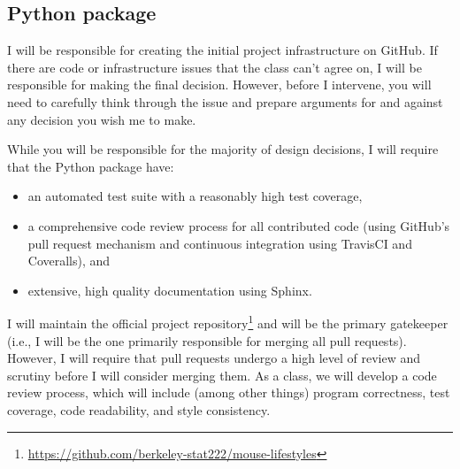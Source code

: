 \documentclass[11pt, oneside]{article}   	%
\begin{document}
\subsection{Python package}

I will be responsible for creating the initial project infrastructure on
GitHub.  If there are code or infrastructure issues that the class can't agree
on, I will be responsible for making the final decision.  However, before I
intervene, you will need to carefully think through the issue and prepare
arguments for and against any decision you wish me to make.

While you will be responsible for the majority of design decisions, I will
require that the Python package have:

\begin{itemize}
\item an automated test suite with a reasonably high test coverage,
\item a comprehensive code review process for all contributed code (using
   GitHub's pull request mechanism and continuous integration using
   TravisCI and Coveralls), and
\item extensive, high quality documentation using Sphinx.
\end{itemize}

I will maintain the official project
repository\footnote{\url{https://github.com/berkeley-stat222/mouse-lifestyles}}
and will be the primary gatekeeper (i.e., I will be the one primarily
responsible for merging all pull requests).  However, I will require that pull
requests undergo a high level of review and scrutiny before I will consider
merging them.  As a class, we will develop a code review process, which will
include (among other things) program correctness, test coverage, code
readability, and style consistency.

%
%
%
\end{document}
